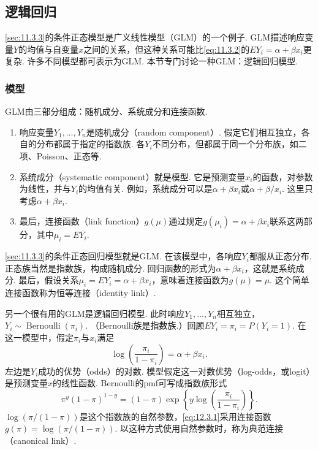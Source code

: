 \subsection{逻辑回归}\label{sec:12.3}
\autoref{sec:11.3.3}的条件正态模型是广义线性模型（GLM）的一个例子. GLM描述响应变量$Y$的均值与自变量$x$之间的关系，但这种关系可能比\eqref{eq:11.3.2}的$EY_i=\alpha+\beta x_i$更复杂. 许多不同模型都可表示为GLM. 本节专门讨论一种GLM：逻辑回归模型.

\subsubsection{模型}\label{sec:12.3.1}
GLM由三部分组成：随机成分、系统成分和连接函数.
\begin{enumerate}[label=(\arabic*)]
\item 响应变量$Y_1,\ldots,Y_n$是随机成分（random component）. 假定它们相互独立，各自的分布都属于指定的指数族. 各$Y_i$不同分布，但都属于同一个分布族，如二项、Poisson、正态等.
\item 系统成分（systematic component）就是模型. 它是预测变量$x_i$的函数，对参数为线性，并与$Y_i$的均值有关. 例如，系统成分可以是$\alpha+\beta x_i$或$\alpha+\beta/x_i$. 这里只考虑$\alpha+\beta x_i$.
\item 最后，连接函数（link function）$g(\mu)$通过规定$g(\mu_i)=\alpha+\beta x_i$联系这两部分，其中$\mu_i=EY_i$.
\end{enumerate}

\autoref{sec:11.3.3}的条件正态回归模型就是GLM. 在该模型中，各响应$Y_i$都服从正态分布. 正态族当然是指数族，构成随机成分. 回归函数的形式为$\alpha+\beta x_i$，这就是系统成分. 最后，假设关系$\mu_i=EY_i=\alpha+\beta x_i$，意味着连接函数为$g(\mu)=\mu$. 这个简单连接函数称为恒等连接（identity link）.

另一个很有用的GLM是逻辑回归模型. 此时响应$Y_1,\ldots,Y_n$相互独立，$Y_i\sim\operatorname{Bernoulli}(\pi_i)$. （Bernoulli族是指数族.）回顾$EY_i=\pi_i=P(Y_i=1)$. 在这一模型中，假定$\pi_i$与$x_i$满足
\begin{equation}\label{eq:12.3.1}
\log\left(\frac{\pi_i}{1-\pi_i}\right)=\alpha+\beta x_i.
\end{equation}
左边是$Y_i$成功的优势（odds）的对数. 模型假定这一对数优势（log-odds，或logit）是预测变量$x$的线性函数. Bernoulli的pmf可写成指数族形式
$$\pi^y(1-\pi)^{1-y}=(1-\pi)\exp\left\{y\log\left(\frac{\pi_i}{1-\pi_i}\right)\right\}.$$
$\log(\pi/(1-\pi))$是这个指数族的自然参数，\eqref{eq:12.3.1}采用连接函数$g(\pi)=\log(\pi/(1-\pi))$. 以这种方式使用自然参数时，称为典范连接（canonical link）.

